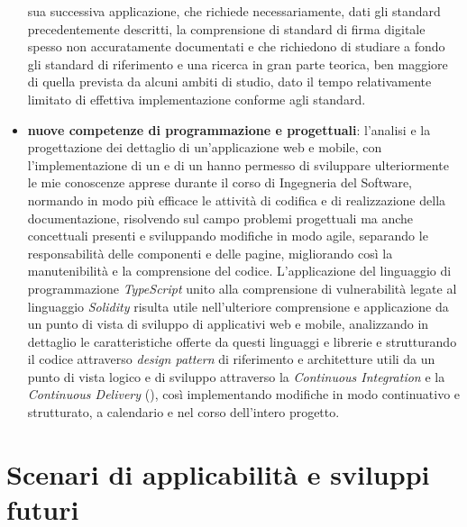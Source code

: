 \begin{itemize}
    sua successiva applicazione, che richiede necessariamente, dati gli standard precedentemente descritti, la comprensione di standard di firma digitale spesso non accuratamente documentati e che richiedono di studiare a fondo gli standard di riferimento e una ricerca
    in gran parte teorica, ben maggiore di quella prevista da alcuni ambiti di studio, dato il tempo relativamente limitato di effettiva implementazione conforme agli standard.
    \item \textbf{nuove competenze di programmazione e progettuali}: l'analisi e la progettazione dei dettaglio di un'applicazione web e mobile, con l'implementazione di un  e di un hanno permesso di sviluppare ulteriormente le mie conoscenze apprese durante il corso di Ingegneria
    del Software, normando in modo più efficace le attività di codifica e di realizzazione della documentazione, risolvendo sul campo problemi progettuali ma anche concettuali presenti e sviluppando modifiche in modo agile, separando le responsabilità delle componenti e delle pagine, 
    migliorando così la manutenibilità e la comprensione del codice. 
    L'applicazione del linguaggio di programmazione \textit{TypeScript} unito alla comprensione di vulnerabilità legate al linguaggio \textit{Solidity} risulta utile nell'ulteriore comprensione e applicazione da un punto di vista di sviluppo di applicativi web e mobile, 
    analizzando in dettaglio le caratteristiche offerte da questi linguaggi e librerie e strutturando il codice attraverso \textit{design pattern} di riferimento e architetture utili da un punto di vista logico e di sviluppo attraverso la \textit{Continuous Integration} e la \textit{Continuous Delivery} (\cite{site:cicd}), così implementando modifiche in modo continuativo 
    e strutturato, a calendario e nel corso dell'intero progetto. 
\end{itemize}

\section{Scenari di applicabilità e sviluppi futuri}\label{sec:conclusioni-conoscenze-sviluppi}

